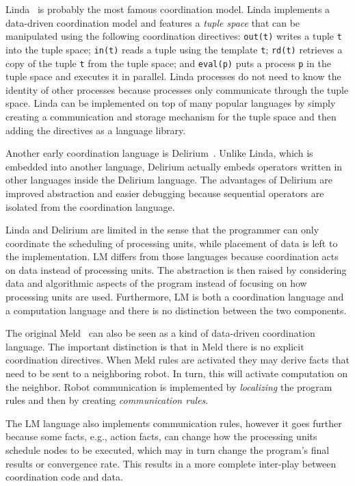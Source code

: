 Linda~\cite{linda} is probably the most famous coordination model. Linda
implements a data-driven coordination model and features a \emph{tuple space}
that can be manipulated using the following coordination directives:
\texttt{out(t)} writes a tuple \texttt{t} into the tuple space; \texttt{in(t)}
reads a tuple using the template \texttt{t}; \texttt{rd(t)} retrieves a copy of
the tuple \texttt{t} from the tuple space; and \texttt{eval(p)} puts a process
\texttt{p} in the tuple space and executes it in parallel.  Linda processes do
not need to know the identity of other processes because processes only
communicate through the tuple space.  Linda can be implemented on top of many
popular languages by simply creating a communication and storage mechanism for
the tuple space and then adding the directives as a language library.

Another early coordination language is Delirium~\cite{Delirium}. Unlike Linda,
which is embedded into another language, Delirium actually embeds operators
written in other languages inside the Delirium language. The advantages of
Delirium are improved abstraction and easier debugging because sequential
operators are isolated from the coordination language.

Linda and Delirium are limited in the sense that the programmer can only
coordinate the scheduling of processing units, while placement of data is left
to the implementation. LM differs from those languages because coordination acts
on data instead of processing units. The abstraction is then raised by
considering data and algorithmic aspects of the program instead of focusing on
how processing units are used. Furthermore, LM is both a coordination language
and a computation language and there is no distinction between the two
components.

The original Meld~\cite{ashley-rollman-iclp09} can also be seen as a kind of
data-driven coordination language. The important distinction is that in Meld
there is no explicit coordination directives. When Meld rules are activated they
may derive facts that need to be sent to a neighboring robot. In turn, this will
activate computation on the neighbor. Robot communication is implemented by
\emph{localizing} the program rules and then by creating \emph{communication
rules}.

The LM language also implements communication rules, however it goes further
because some facts, e.g., action facts, can change how the processing units
schedule nodes to be executed, which may in turn change the program's final
results or convergence rate. This results in a more complete inter-play between
coordination code and data.

